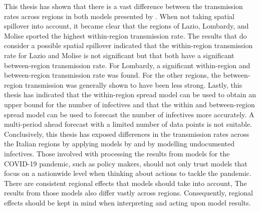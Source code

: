 \documentclass[12pt]{article}
\begin{document}
	This thesis has shown that there is a vast difference between the transmission rates across regions in both models presented by \textcite{adda2016economic}. When not taking spatial spillover into account, it became clear that the regions of Lazio, Lombardy, and Molise sported the highest within-region transmission rate. The results that do consider a possible spatial spillover indicated that the within-region transmission rate for Lazio and Molise is not significant but that both have a significant between-region transmission rate. For Lombardy, a significant within-region and between-region transmission rate was found. For the other regions, the between-region transmission was generally shown to have been less strong. Lastly, this thesis has indicated that the within-region spread model can be used to obtain an upper bound for the number of infectives and that the within and between-region spread model can be used to forecast the number of infectives more accurately. A multi-period ahead forecast with a limited number of data points is not suitable. \\
	
	Conclusively, this thesis has exposed differences in the transmission rates across the Italian regions by applying models by \textcite{adda2016economic} and by modelling undocumented infectives. Those involved with processing the results from models for the COVID-19 pandemic, such as policy makers, should not only trust models that focus on a nationwide level when thinking about actions to tackle the pandemic. There are consistent regional effects that models should take into account, The results from those models also differ vastly across regions. Consequently, regional effects should be kept in mind when interpreting and acting upon model results.
	
	
\end{document}
